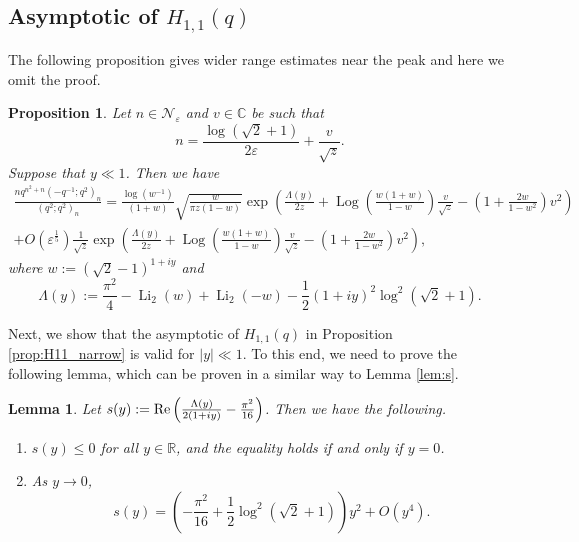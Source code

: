 \documentclass[11pt,reqno]{amsart}
\newtheorem{lemma}[theorem]{Lemma}
\newtheorem{proposition}[theorem]{Proposition}
\theoremstyle{remark}
\numberwithin{equation}{section}
\def\Log{\operatorname{Log}}
\def\Li{\operatorname{Li}}
\renewcommand{\Re}{{\rm Re}}
\renewcommand{\Re}{{\rm Re}}
\def\Log{\operatorname{Log}}
\def\Li{\operatorname{Li}}
\begin{document}
\subsection{Asymptotic of $H_{1,1}(q)$}\label{sec:H_asymp}

The following proposition gives wider range estimates near the peak and here we omit the proof.

\begin{proposition}\label{prop:H_wider}
	Let $n \in \mathcal{N}_{\varepsilon}$ and $v \in \mathbb{C}$ be such that
	\begin{equation*}
		n = \frac{\log(\sqrt{2}+1)}{2\varepsilon} + \frac{v}{\sqrt{z}}. 
	\end{equation*}
	Suppose that $y \ll 1$. Then we have
	\begin{align*}
		\frac{ n q^{n^2+n} (-q^{-1};q^2)_n}{(q^2;q^2)_n}
		=  \frac{\log(w^{-1})}{(1+w)}\sqrt{\frac{w}{\pi z(1-w)}} \exp\left( \frac{\Lambda(y)}{2z} + \Log\left(\frac{w(1+w)}{1-w}\right) \frac{v}{\sqrt{z}} -\left(1+\frac{2w}{1-w^2}\right) v^2 \right)\\
		+ O\left( \varepsilon^{\frac15} \right) \frac{1}{\sqrt{z}}\exp\left( \frac{\Lambda(y)}{2z} + \Log\left(\frac{w(1+w)}{1-w}\right) \frac{v}{\sqrt{z}} -\left(1+\frac{2w}{1-w^2}\right) v^2 \right),
	\end{align*}
	where $w := (\sqrt{2}-1)^{1+iy}$ and 
	\[
		\Lambda(y) := \frac{\pi^2}{4} - \Li_2(w)+ \Li_2(-w)  - \frac12 (1+iy)^2 \log^2(\sqrt{2}+1).
	\]
\end{proposition}




Next, we show that the asymptotic of $H_{1,1}(q)$ in Proposition \ref{prop:H11_narrow} is valid for $|y|\ll 1$. To this end, we need to prove the following lemma, which can be proven in a similar way to Lemma \ref{lem:s}. 

\begin{lemma}\label{lem:H_s}
	Let $s(y):=\Re\left(\frac{\Lambda(y)}{2(1+iy)} - \frac{\pi^2}{16}\right)$. Then we have the following.
	\begin{enumerate}
		\item $s(y) \leq 0$ for all $y \in \mathbb{R}$, and the equality holds if and only if $y=0$.
		\item As $y \to 0$,
		\[
			s(y) = \left(-\frac{\pi^2}{16} + \frac12\log^2(\sqrt{2}+1) \right)y^2 + O\left(y^4\right).
		\]
	\end{enumerate}
\end{lemma}
\end{document}
